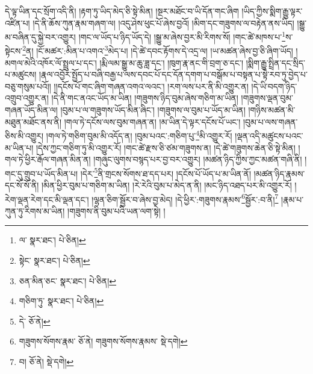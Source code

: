 དེ་ལྟ་ཡིན་དང་སྲོག་འདི་ནི། །རྟག་ཏུ་ཡིད་མེད་ཅི་སྟེ་མིན། །སྔར་མཐོང་བ་ཡི་དོན་གང་ཞིག །ཡིད་ཀྱིས་སྨིག་རྒྱུ་ལྟར་འཛིན་པ། །དེ་ནི་ཆོས་ཀུན་རྣམ་གཞག་ལ། །འདུ་ཤེས་ཕུང་པོ་ཞེས་བྱའོ། །མིག་དང་གཟུགས་ལ་བརྟེན་ནས་ཡིད། །སྒྱུ་མ་བཞིན་དུ་སྐྱེ་བར་འགྱུར། །གང་ལ་ཡོད་པ་ཉིད་ཡོད་དེ། །སྒྱུ་མ་ཞེས་བྱར་མི་རིགས་སོ། །གང་ཚེ་མཁས་པ་\footnote{ལ་  སྣར་ཐང་།  པེ་ཅིན། }ས་སྟེངས་\footnote{སྟེང་  སྣར་ཐང་།  པེ་ཅིན། }ན། །ངོ་མཚར་:མིན་པ་འགའ་\footnote{ཅན་མིན་ཅང་  སྣར་ཐང་།  པེ་ཅིན། }མེད་པ། །དེ་ཚེ་དབང་རྟོགས་དེ་འདྲ་ལ། །ཡ་མཚན་ཞེས་བྱ་ཅི་ཞིག་ཡོད། །མགལ་མེའི་འཁོར་ལོ་སྤྲུལ་པ་དང་། །རྨི་ལམ་སྒྱུ་མ་ཆུ་ཟླ་དང་། །ཁུག་རྣ་ནང་གི་བྲག་ཅ་དང་། །སྨིག་རྒྱུ་སྤྲིན་དང་སྲིད་པ་མཚུངས། །རྣལ་འབྱོར་སྤྱོད་པ་བཞི་བརྒྱ་པ་ལས་དབང་པོ་དང་དོན་དགག་པ་བསྒོམ་པ་བསྟན་པ་སྟེ་རབ་ཏུ་བྱེད་པ་བཅུ་གསུམ་པའོ།། །།དངོས་པོ་གང་ཞིག་གཞན་འགའ་ལའང་། །རག་ལས་པར་ནི་མི་འགྱུར་ན། །དེ་ཡི་བདག་ཉིད་འགྲུབ་འགྱུར་ན། །དེ་ནི་གང་ནའང་ཡོད་མ་ཡིན། །གཟུགས་ཉིད་བུམ་ཞེས་གཅིག་མ་ཡིན། །གཟུགས་ལྡན་བུམ་གཞན་ཡོད་མིན་ལ། །བུམ་པ་ལ་གཟུགས་ཡོད་མིན་ཞིང་། །གཟུགས་ལ་བུམ་པ་ཡོད་མ་ཡིན། །གཉིས་མཚན་མི་མཐུན་མཐོང་ནས་ནི། །གལ་ཏེ་དངོས་ལས་བུམ་གཞན་ན། །མ་ཡིན་དེ་ལྟར་དངོས་པོ་ཡང་། །བུམ་པ་ལས་གཞན་ཅིས་མི་འགྱུར། །གལ་ཏེ་གཅིག་བུམ་མི་འདོད་ན། །བུམ་པའང་:གཅིག་པུ་\footnote{གཅིག་ཏུ་  སྣར་ཐང་།  པེ་ཅིན། }མི་འགྱུར་རོ། །ལྡན་འདི་མཚུངས་པའང་མ་ཡིན་པ། །དེས་ཀྱང་གཅིག་ཏུ་མི་འགྱུར་རོ། །གང་ཚེ་རྫས་ཅི་ཙམ་གཟུགས་ན། །དེ་ཚེ་གཟུགས་ཆེན་ཅི་སྟེ་མིན། །གལ་ཏེ་ཕྱིར་རྒོལ་གཞན་མིན་ན། །གཞུང་ལུགས་བསྙད་པར་བྱ་བར་འགྱུར། །མཚན་ཉིད་ཀྱིས་ཀྱང་མཚན་གཞི་ནི། །གང་དུ་གྲུབ་པ་ཡོད་མིན་པ། །དེར་\footnote{དེ་  ཅོ་ནེ། }ནི་གྲངས་སོགས་ཐ་དད་པར། །དངོས་པོ་ཡོད་པ་མ་ཡིན་ནོ། །མཚན་ཉིད་རྣམས་དང་སོ་སོ་ནི། །མིན་ཕྱིར་བུམ་པ་གཅིག་མ་ཡིན། །རེ་རེའི་བུམ་པ་མེད་ན་ནི། །མང་ཉིད་འཐད་པར་མི་འགྱུར་རོ། །རེག་ལྡན་རེག་དང་མི་ལྡན་དང་། །ལྷན་ཅིག་སྦྱོར་བ་ཞེས་བྱ་མེད། །དེ་ཕྱིར་:གཟུགས་རྣམས་\footnote{གཟུགས་སོགས་རྣམ་  ཅོ་ནེ། གཟུགས་སོགས་རྣམས་  སྡེ་དགེ། }སྦྱོར་:བ་ནི།\footnote{བ།  ཅོ་ནེ།  སྡེ་དགེ། } །རྣམ་པ་ཀུན་ཏུ་རིགས་མ་ཡིན། །གཟུགས་ནི་བུམ་པའི་ཡན་ལག་སྟེ། །
